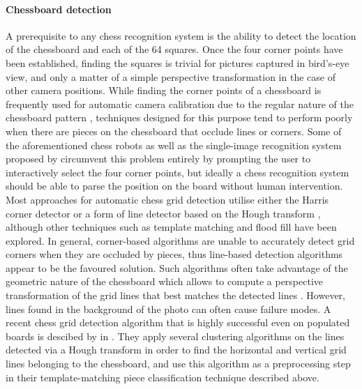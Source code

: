 \paragraph{Chessboard detection}
A prerequisite to any chess recognition system is the ability to detect the location of the chessboard and each of the 64 squares. 
Once the four corner points have been established, finding the squares is trivial for pictures captured in bird's-eye view, and only a matter of a simple perspective transformation in the case of other camera positions.
While finding the corner points of a chessboard is frequently used for automatic camera calibration due to the regular nature of the chessboard pattern \cite{delaescalera2010,bennett2014}, techniques designed for this purpose tend to perform poorly when there are pieces on the chessboard that occlude lines or corners.
Some of the aforementioned chess robots \cite{goncalves2005,sokic2008,khan2014} as well as the single-image recognition system proposed by \textcite{danner2015} circumvent this problem entirely by prompting the user to interactively select the four corner points, but ideally a chess recognition system should be able to parse the position on the board without human intervention.
Most approaches for automatic chess grid detection utilise either the Harris corner detector \cite{banerjee2012,hack2014} or a form of line detector based on the Hough transform \cite{tam2008,neufeld2010,danner2015,chen2016,kanchibail2016,xie2018a,chen2019}, although other techniques such as template matching \cite{matuszek2011} and flood fill \cite{wang2013} have been explored.
In general, corner-based algorithms are unable to accurately detect grid corners when they are occluded by pieces, thus line-based detection algorithms appear to be the favoured solution.
Such algorithms often take advantage of the geometric nature of the chessboard which allows to compute a perspective transformation of the grid lines that best matches the detected lines \cite{tam2008,hack2014,xie2018}.
However, lines found in the background of the photo can often cause failure modes.
A recent chess grid detection algorithm that is highly successful even on populated boards is descibed by \citeauthor{xie2018a} in \cite{xie2018a}. 
They apply several clustering algorithms on the lines detected via a Hough transform in order to find the horizontal and vertical grid lines belonging to the chessboard, and use this algorithm as a preprocessing step in their template-matching piece classification technique \cite{xie2018} described above. 

